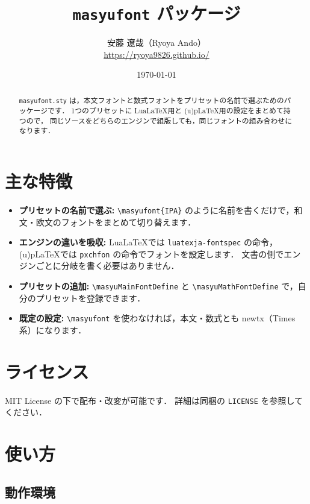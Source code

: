 \documentclass[lualatex,ja=standard,a4paper,11pt]{bxjsarticle}
\title{\texttt{masyufont} パッケージ}
\author{安藤 遼哉（Ryoya Ando）\\\url{https://ryoya9826.github.io/}}
\date{\today}
\begin{document}
\maketitle
\begin{abstract}
\noindent
\texttt{masyufont.sty} は，本文フォントと数式フォントをプリセットの名前で選ぶためのパッケージです．
1つのプリセットに Lua\LaTeX 用と (u)p\LaTeX 用の設定をまとめて持つので，
同じソースをどちらのエンジンで組版しても，同じフォントの組み合わせになります．
\end{abstract}

\tableofcontents

\section{主な特徴}

\begin{itemize}
\item \textbf{プリセットの名前で選ぶ:}
  \verb|\masyufont{IPA}| のように名前を書くだけで，和文・欧文のフォントをまとめて切り替えます．
\item \textbf{エンジンの違いを吸収:}
  Lua\LaTeX では \texttt{luatexja-fontspec} の命令，(u)p\LaTeX では \texttt{pxchfon} の命令でフォントを設定します．
  文書の側でエンジンごとに分岐を書く必要はありません．
\item \textbf{プリセットの追加:}
  \verb|\masyuMainFontDefine| と \verb|\masyuMathFontDefine| で，自分のプリセットを登録できます．
\item \textbf{既定の設定:}
  \verb|\masyufont| を使わなければ，本文・数式とも newtx（Times 系）になります．
\end{itemize}

\section{ライセンス}

MIT License の下で配布・改変が可能です．
詳細は同梱の \texttt{LICENSE} を参照してください．

\section{使い方}

\subsection{動作環境}
\end{document}
